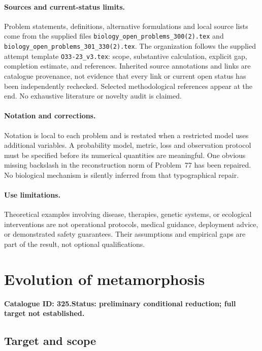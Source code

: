 \documentclass[11pt]{article}
\begin{document}
\paragraph{Sources and current-status limits.}
Problem statements, definitions, alternative formulations and local source lists
come from the supplied files
\texttt{biology\_open\_problems\_300(2).tex} and
\texttt{biology\_open\_problems\_301\_330(2).tex}.
The organization follows the supplied attempt template
\texttt{O33-23\_v3.tex}: scope, substantive calculation, explicit gap,
completion estimate, and references. Inherited source annotations and links are
catalogue provenance, not evidence that every link or current open status has
been independently rechecked. Selected methodological references appear at the
end. No exhaustive literature or novelty audit is claimed.

\paragraph{Notation and corrections.}
Notation is local to each problem and is restated when a restricted model uses
additional variables. A probability model, metric, loss and observation protocol
must be specified before its numerical quantities are meaningful. One obvious
missing backslash in the reconstruction norm of Problem~77 has been repaired.
No biological mechanism is silently inferred from that typographical repair.

\paragraph{Use limitations.}
Theoretical examples involving disease, therapies, genetic systems, or ecological
interventions are not operational protocols, medical guidance, deployment advice,
or demonstrated safety guarantees. Their assumptions and empirical gaps are part
of the result, not optional qualifications.

\setcounter{section}{324}
\section{Evolution of metamorphosis}
\label{prob:325}
\noindent\textbf{Catalogue ID: 325.}\quad \textbf{Status: preliminary conditional reduction; full target not established.}
\subsection{Target and scope}
\end{document}
